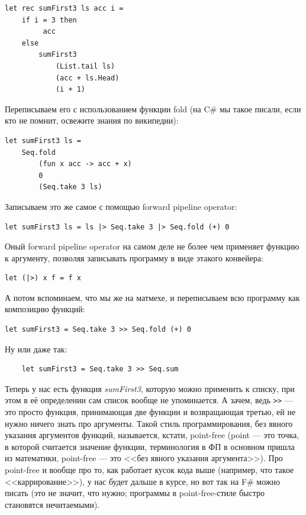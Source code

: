 \documentclass[a5paper]{article}
\begin{document}
\begin{verbatim}
let rec sumFirst3 ls acc i =
    if i = 3 then 
         acc 
    else 
        sumFirst3 
            (List.tail ls) 
            (acc + ls.Head) 
            (i + 1)
\end{verbatim}

Переписываем его с использованием функции fold (на C\# мы такое писали, если кто не помнит, освежите знания по википедии):

\begin{verbatim}
let sumFirst3 ls = 
    Seq.fold 
        (fun x acc -> acc + x) 
        0 
        (Seq.take 3 ls)
\end{verbatim}

Записываем это же самое с помощью forward pipeline operator:
\begin{verbatim}
let sumFirst3 ls = ls |> Seq.take 3 |> Seq.fold (+) 0
\end{verbatim}

Оный  forward pipeline operator на самом деле не более чем применяет функцию к аргументу, позволяя записывать программу в виде этакого конвейера:
\begin{verbatim}
let (|>) x f = f x
\end{verbatim}

А потом вспоминаем, что мы же на матмехе, и переписываем всю программу как композицию функций:

\begin{verbatim}
let sumFirst3 = Seq.take 3 >> Seq.fold (+) 0
\end{verbatim}

Ну или даже так:

\begin{verbatim}
    let sumFirst3 = Seq.take 3 >> Seq.sum
\end{verbatim}

Теперь у нас есть функция \textit{sumFirst3}, которую можно применить к списку, при этом в её определении сам список вообще не упоминается. А зачем, ведь \verb|>>| --- это просто функция, принимающая две функции и возвращающая третью, ей не нужно ничего знать про аргументы. Такой стиль программирования, без явного указания аргументов функций, называется, кстати, point-free (point --- это точка, в которой считается значение функции, терминология в ФП в основном пришла из математики, point-free --- это <<без явного указания аргумента>>). Про point-free и вообще про то, как работает кусок кода выше (например, что такое <<каррирование>>), у нас будет дальше в курсе, но вот так на F\# можно писать (это не значит, что нужно; программы в point-free-стиле быстро становятся нечитаемыми).
\end{document}
